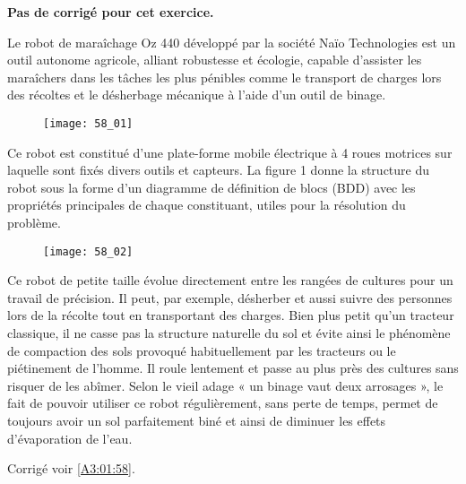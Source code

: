 \normaltrue \difficilefalse \tdifficilefalse
\correctionfalse

\setcounter{numques}{0}

\ifcorrection
\else
\textbf{Pas de corrigé pour cet exercice.}
\fi

\ifprof
\else


Le robot de maraîchage Oz 440 développé par la société Naïo Technologies est un outil autonome
agricole, alliant robustesse et écologie, capable d’assister les maraîchers dans les tâches les plus
pénibles comme le transport de charges lors des récoltes et le désherbage mécanique à l’aide d’un
outil de binage.


\begin{figure}[H]
\centering
\texttt{[image: 58\_01]}
\end{figure}


Ce robot est constitué d’une plate-forme mobile électrique à 4 roues motrices sur laquelle sont
fixés divers outils et capteurs. La figure 1 donne la structure du robot sous la forme d’un
diagramme de définition de blocs (BDD) avec les propriétés principales de chaque constituant,
utiles pour la résolution du problème.

\begin{figure}[H]
\centering
\texttt{[image: 58\_02]}
\end{figure}


Ce robot de petite taille évolue directement entre les rangées de cultures pour un travail de
précision. Il peut, par exemple, désherber et aussi suivre des personnes lors de la récolte tout en
transportant des charges. Bien plus petit qu’un tracteur classique, il ne casse pas la structure
naturelle du sol et évite ainsi le phénomène de compaction des sols provoqué habituellement par les
tracteurs ou le piétinement de l’homme. Il roule lentement et passe au plus près des cultures sans
risquer de les abîmer. Selon le vieil adage « un binage vaut deux arrosages », le fait de pouvoir
utiliser ce robot régulièrement, sans perte de temps, permet de toujours avoir un sol parfaitement
biné et ainsi de diminuer les effets d’évaporation de l’eau.
\fi

\ifprof
\else
\begin{flushright}
\footnotesize{Corrigé  voir \ref{A3:01:58}.}
\end{flushright}%
\fi